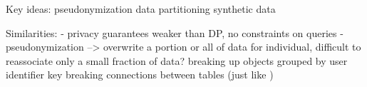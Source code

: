 



\iffalse
Key ideas:
    pseudonymization
    data partitioning
    synthetic data

Similarities:
- privacy guarantees weaker than DP, no constraints on queries
- pseudonymization --> overwrite a portion or all of data for individual, difficult to reassociate
    only a small fraction of data?
    breaking up objects grouped by user identifier key
    breaking connections between tables (just like )

